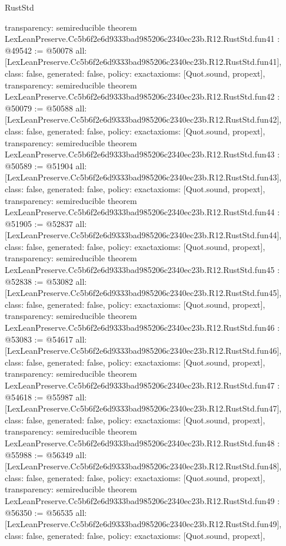 \begin{lexlean}{RustStd}
\begin{coremodule}
{  transparency: semireducible
}
theorem LexLeanPreserve.Cc5b6f2e6d9333bad985206c2340ec23b.R12.RustStd.fun41 : @49542 := @50078 {
  all: [LexLeanPreserve.Cc5b6f2e6d9333bad985206c2340ec23b.R12.RustStd.fun41],
  class: false,
  generated: false,
  policy: exact{axioms: [Quot.sound, propext]},
  transparency: semireducible
}
theorem LexLeanPreserve.Cc5b6f2e6d9333bad985206c2340ec23b.R12.RustStd.fun42 : @50079 := @50588 {
  all: [LexLeanPreserve.Cc5b6f2e6d9333bad985206c2340ec23b.R12.RustStd.fun42],
  class: false,
  generated: false,
  policy: exact{axioms: [Quot.sound, propext]},
  transparency: semireducible
}
theorem LexLeanPreserve.Cc5b6f2e6d9333bad985206c2340ec23b.R12.RustStd.fun43 : @50589 := @51904 {
  all: [LexLeanPreserve.Cc5b6f2e6d9333bad985206c2340ec23b.R12.RustStd.fun43],
  class: false,
  generated: false,
  policy: exact{axioms: [Quot.sound, propext]},
  transparency: semireducible
}
theorem LexLeanPreserve.Cc5b6f2e6d9333bad985206c2340ec23b.R12.RustStd.fun44 : @51905 := @52837 {
  all: [LexLeanPreserve.Cc5b6f2e6d9333bad985206c2340ec23b.R12.RustStd.fun44],
  class: false,
  generated: false,
  policy: exact{axioms: [Quot.sound, propext]},
  transparency: semireducible
}
theorem LexLeanPreserve.Cc5b6f2e6d9333bad985206c2340ec23b.R12.RustStd.fun45 : @52838 := @53082 {
  all: [LexLeanPreserve.Cc5b6f2e6d9333bad985206c2340ec23b.R12.RustStd.fun45],
  class: false,
  generated: false,
  policy: exact{axioms: [Quot.sound, propext]},
  transparency: semireducible
}
theorem LexLeanPreserve.Cc5b6f2e6d9333bad985206c2340ec23b.R12.RustStd.fun46 : @53083 := @54617 {
  all: [LexLeanPreserve.Cc5b6f2e6d9333bad985206c2340ec23b.R12.RustStd.fun46],
  class: false,
  generated: false,
  policy: exact{axioms: [Quot.sound, propext]},
  transparency: semireducible
}
theorem LexLeanPreserve.Cc5b6f2e6d9333bad985206c2340ec23b.R12.RustStd.fun47 : @54618 := @55987 {
  all: [LexLeanPreserve.Cc5b6f2e6d9333bad985206c2340ec23b.R12.RustStd.fun47],
  class: false,
  generated: false,
  policy: exact{axioms: [Quot.sound, propext]},
  transparency: semireducible
}
theorem LexLeanPreserve.Cc5b6f2e6d9333bad985206c2340ec23b.R12.RustStd.fun48 : @55988 := @56349 {
  all: [LexLeanPreserve.Cc5b6f2e6d9333bad985206c2340ec23b.R12.RustStd.fun48],
  class: false,
  generated: false,
  policy: exact{axioms: [Quot.sound, propext]},
  transparency: semireducible
}
theorem LexLeanPreserve.Cc5b6f2e6d9333bad985206c2340ec23b.R12.RustStd.fun49 : @56350 := @56535 {
  all: [LexLeanPreserve.Cc5b6f2e6d9333bad985206c2340ec23b.R12.RustStd.fun49],
  class: false,
  generated: false,
  policy: exact{axioms: [Quot.sound, propext]},
}
\end{coremodule}
\end{lexlean}
